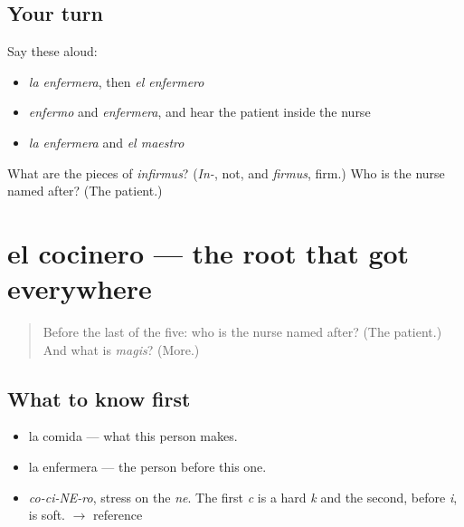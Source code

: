 \subsection*{Your turn}
Say these aloud:

\begin{itemize}
\raggedright
  \item \emph{la enfermera}, then \emph{el enfermero}
  \item \emph{enfermo} and \emph{enfermera}, and hear the patient inside the nurse
  \item \emph{la enfermera} and \emph{el maestro}
\end{itemize}

\begin{tcolorbox}[breakable,colback=teal!4,colframe=teal!35!black,title={Before you move on}]
What are the pieces of \emph{infirmus}? (\emph{In-}, not, and \emph{firmus}, firm.) Who is the nurse named after? (The patient.)
\end{tcolorbox}
\section[el cocinero]{el cocinero — the root that got everywhere}

\label{lesson:ES-C285-cocinero}



\begin{quote}
Before the last of the five: who is the nurse named after? (The patient.) And what is \emph{magis}? (More.)
\end{quote}

\subsection*{What to know first}
\begin{itemize}
\raggedright
  \item la comida — what this person makes.
  \item la enfermera — the person before this one.
\end{itemize}

\begin{sounds}
\begin{itemize}
\raggedright
  \item \emph{co-ci-NE-ro}, stress on the \emph{ne}. The first \emph{c} is a hard \emph{k} and the second, before \emph{i}, is soft. $\to$ reference
\end{itemize}
\end{sounds}

